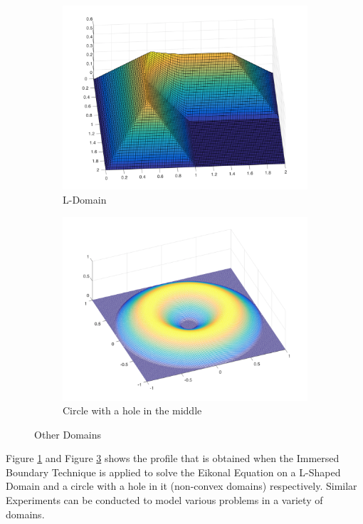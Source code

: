 \documentclass[11pt]{report}
\begin{document}
\begin{figure}[h!]
	\begin{subfigure}{.5\textwidth}
		\includegraphics[scale = 0.2]{ldomain.png}
		\caption{L-Domain}
		\label{fig:6}
	\end{subfigure}
	\begin{subfigure}{.5\textwidth}
		\includegraphics[scale = 0.2]{circlehole.png}
		\caption{Circle with a hole in the middle}
		\label{fig:7}
	\end{subfigure}
	\caption{Other Domains}
\end{figure}

\noindent
Figure \ref{fig:6} and Figure \ref{fig:7} shows the profile that is obtained when the Immersed Boundary Technique is applied to solve the Eikonal Equation on a L-Shaped Domain and a circle with a hole in it (non-convex domains) respectively. Similar Experiments can be conducted to model various problems in a variety of domains.
\end{document}
